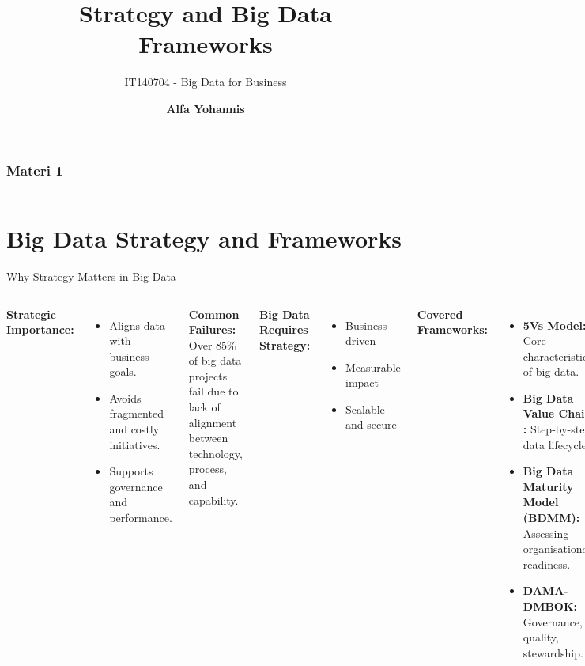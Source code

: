 \documentclass[aspectratio=169, table]{beamer}
\title{\Huge Strategy and Big Data\\
	\vspace{10pt}
	Frameworks}
\subtitle{IT140704 - Big Data for Business}
\author{\textbf{Alfa Yohannis}}
\begin{document}
	
	\frame{\titlepage}
	
	
	\begin{frame}[fragile]
		\frametitle{Materi 1}
		\vspace{20pt}
		\begin{columns}[t]
			\tableofcontents[sections={1-3}]
			
			\tableofcontents[sections={4-6}]
		\end{columns}
	\end{frame}
	
	\section{Big Data Strategy and Frameworks}
	
	\begin{frame}[fragile]{Why Strategy Matters in Big Data}
		\vspace{20pt}
		\small
		\begin{columns}[T]
			\textbf{Strategic Importance:}
			\begin{itemize}
				\item Aligns data with business goals.
				\item Avoids fragmented and costly initiatives.
				\item Supports governance and performance.
			\end{itemize}
			
			\textbf{Common Failures:} Over 85\% of big data projects fail due to lack of alignment between technology, process, and capability.
			
			
			\vspace{5pt}
			\textbf{Big Data Requires Strategy:}
			\begin{itemize}
				\item Business-driven
				\item Measurable impact
				\item Scalable and secure
			\end{itemize}
			
			\textbf{Covered Frameworks:}
			\begin{itemize}
				\item \textbf{5Vs Model:} Core characteristics of big data.
				\item \textbf{Big Data Value Chain :} Step-by-step data lifecycle.
				\item \textbf{Big Data Maturity Model (BDMM):} Assessing organisational readiness.
				\item \textbf{DAMA-DMBOK:} Governance, quality, stewardship.
			\end{itemize}
			
			\textbf{Strategic Outcome:}  
			Big data strategy bridges vision and execution, supporting digital transformation and data-driven decision-making.
		\end{columns}
	\end{frame}
	
\end{document}
